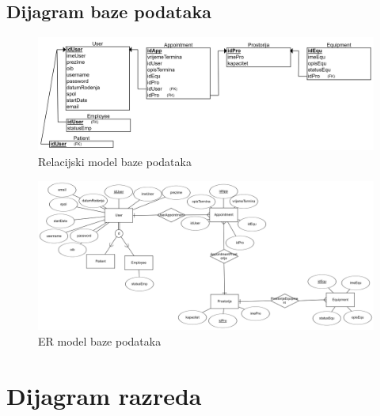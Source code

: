 			\newpage
			
			\subsection{Dijagram baze podataka}
				
				\begin{figure}[H]
					\includegraphics[scale=0.14]{slike/bp_rel.PNG} %
					\centering
					\caption{Relacijski model baze podataka}
					\label{fig:promjene}
				\end{figure}
				
				\begin{figure}[H]
					\includegraphics[scale=0.085]{slike/bp_er.PNG} %
					\centering
					\caption{ER model baze podataka}
					\label{fig:promjene}
				\end{figure}
			
			\eject
			
			
		\section{Dijagram razreda}
		
